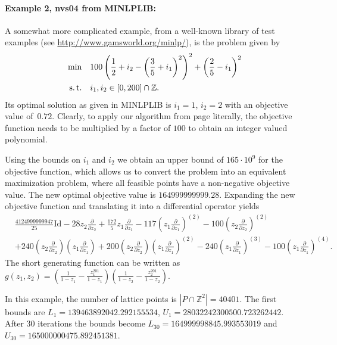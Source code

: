 \documentclass[twoside]{article}
\newcommand{\Z}{\mathbb Z}
\newcommand{\1}{{\bf 1}}
\begin{document}
\paragraph{Example 2, nvs04 from {\small MINLPLIB}:}
A somewhat more complicated example, from a well-known
library of test examples (see \url{http://www.gamsworld.org/minlp/}),
is the problem given by
\begin{equation}
  \begin{aligned}
    \min\quad & 100 \left(\frac12 + i_2 - \left(\frac35 + i_1\right)^2 \right)^2 + \left(\frac25 -
    i_1\right)^2\\
    \text{s.\,t.}\quad & i_1, i_2 \in [0,200] \cap \Z.
  \end{aligned}
\end{equation}
Its optimal solution as given in {\small MINLPLIB} is $i_1=1$, $i_2=2$ with an
objective value of~$0.72$. Clearly, to apply our algorithm from page
\pageref{Algorithm} literally, the objective function needs to be
multiplied by a factor of $100$ to obtain an integer valued polynomial.

Using the bounds on $i_1$ and $i_2$ we obtain an upper bound of $165
\cdot 10^9$ for the objective function, which allows us to convert the
problem into an equivalent maximization problem, where all feasible
points have a non-negative objective value. The new optimal objective
value is $164999999999.28.$ Expanding the new
objective function and translating it into a differential operator
yields
  \begin{align*}
    &\frac{4124999999947}{25} \mathrm{Id} - 28 z_2 \frac{\partial}{\partial
      z_2}+\frac{172}{5} z_1\frac{\partial}{\partial z_1}-117 \left(z_1
      \frac{\partial}{\partial z_1} \right) ^{(2)} - 100
    \left(z_2 \frac{\partial}{\partial z_2}\right)^{(2)} \\
    &+ 240 \left(z_2
      \frac{\partial}{\partial z_2}\right) \left(z_1 \frac{\partial}{\partial
        z_1}\right) 
    + 200  \left(z_2
      \frac{\partial}{\partial z_2}\right) \left(z_1 \frac{\partial}{\partial
        z_1}\right) ^{(2)} - 240 \left(z_1 \frac{\partial}{\partial
        z_1}\right)^{(3)}  
    - 100 \left(z_1 \frac{\partial}{\partial
        z_1}\right)^{(4)}.
  \end{align*}
The short generating function can be written as 
$ g(z_1,z_2) = \left( \frac1{1-z_1} - \frac{z_1^{201}}{1-z_1} \right)
  \left( \frac1{1-z_2} - \frac{z_2^{201}}{1-z_2} \right).$

In this example, the number of lattice points is $|P\cap \Z^2|=40401.$
The first bounds are $L_1=139463892042.292155534$,
$U_1=28032242300500.723262442$.  After 30 iterations the bounds become
$L_{30}=164999998845.993553019$ and $U_{30}=165000000475.892451381.$
\end{document}
